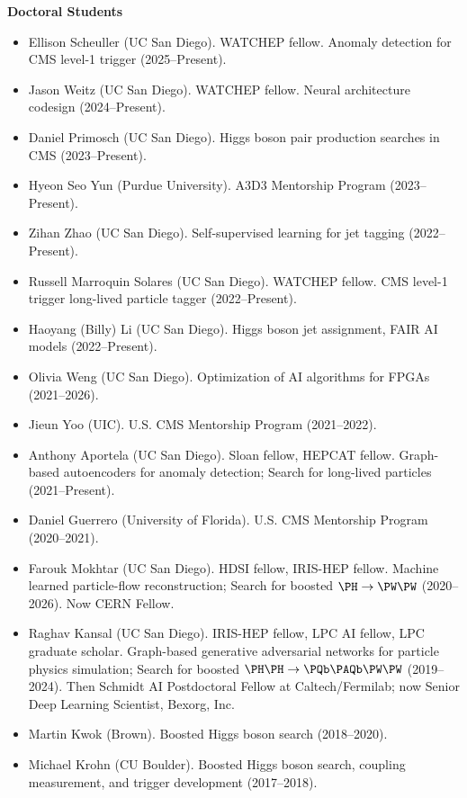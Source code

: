 \documentclass[11pt]{res}
\begin{document}
\begin{resume}
  \textbf{Doctoral Students}
  \begin{itemize}
    \itemsep-0.3em
    \item Ellison Scheuller (UC San Diego). WATCHEP fellow. Anomaly detection for CMS level-1 trigger (2025--Present).
    \item Jason Weitz (UC San Diego). WATCHEP fellow. Neural architecture codesign (2024--Present).
    \item Daniel Primosch (UC San Diego). Higgs boson pair production searches in CMS (2023--Present).
    \item Hyeon Seo Yun (Purdue University). A3D3 Mentorship Program (2023--Present).
    \item Zihan Zhao (UC San Diego). Self-supervised learning for jet tagging ({2022--Present}).
    \item Russell Marroquin Solares (UC San Diego). WATCHEP fellow. CMS level-1 trigger long-lived particle tagger ({2022--Present}).
    \item Haoyang (Billy) Li (UC San Diego). Higgs boson jet assignment, FAIR AI models ({2022--Present}).
    \item Olivia Weng (UC San Diego). Optimization of AI algorithms for FPGAs ({2021--2026}).
    \item Jieun Yoo (UIC). U.S. CMS Mentorship Program ({2021--2022}).
    \item Anthony Aportela (UC San Diego). Sloan fellow, HEPCAT fellow. Graph-based autoencoders for anomaly detection; Search for long-lived particles ({2021--Present}).
    \item Daniel Guerrero (University of Florida). U.S. CMS Mentorship Program ({2020--2021}).
    \item Farouk Mokhtar (UC San Diego). HDSI fellow, IRIS-HEP fellow. Machine learned particle-flow reconstruction; Search for boosted $\PH\to\PW\PW$ ({2020--2026}). Now CERN Fellow.
    \item Raghav Kansal (UC San Diego). IRIS-HEP fellow, LPC AI fellow, LPC graduate scholar. Graph-based generative adversarial networks for particle physics simulation; Search for boosted $\PH\PH\to\bbbar\PW\PW$ ({2019--2024}). Then Schmidt AI Postdoctoral Fellow at Caltech/Fermilab; now Senior Deep Learning Scientist, Bexorg, Inc.
    \item Martin Kwok (Brown). Boosted Higgs boson search ({2018--2020}).
    \item Michael Krohn (CU Boulder). Boosted Higgs boson search, coupling measurement, and trigger development ({2017--2018}).

\end{itemize}
\end{resume}
\end{document}
